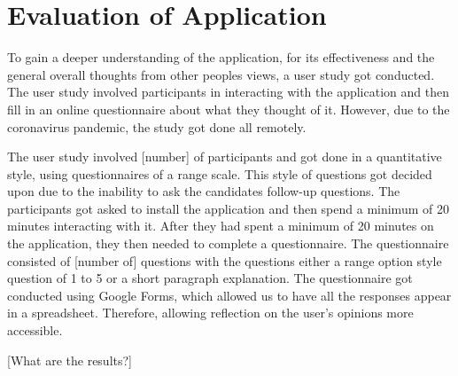 			
	\section{Evaluation of Application}
		\label{sec:app_evaluation}
	
		To gain a deeper understanding of the application, for its effectiveness and the general overall thoughts from other peoples views, a user study got conducted. The user study involved participants in interacting with the application and then fill in an online questionnaire about what they thought of it. However, due to the coronavirus pandemic, the study got done all remotely.
		
		The user study involved [number] of participants and got done in a quantitative style, using questionnaires of a range scale. This style of questions got decided upon due to the inability to ask the candidates follow-up questions. The participants got asked to install the application and then spend a minimum of 20 minutes interacting with it. After they had spent a minimum of 20 minutes on the application, they then needed to complete a questionnaire. The questionnaire consisted of [number of] questions with the questions either a range option style question of 1 to 5 or a short paragraph explanation. The questionnaire got conducted using Google Forms, which allowed us to have all the responses appear in a spreadsheet. Therefore, allowing reflection on the user's opinions more accessible.
		
		[What are the results?]
		